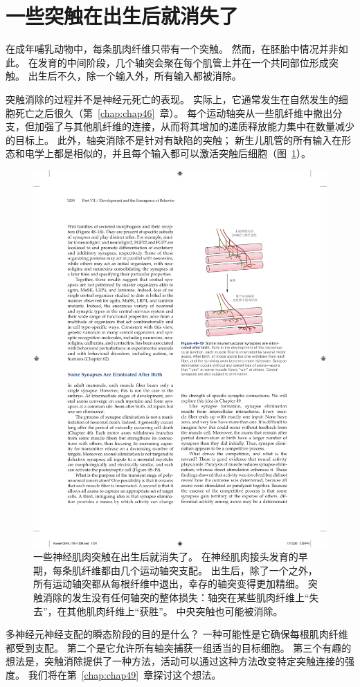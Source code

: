 \section{一些突触在出生后就消失了}

在成年哺乳动物中，每条肌肉纤维只带有一个突触。
然而，在胚胎中情况并非如此。
在发育的中间阶段，几个轴突会聚在每个肌管上并在一个共同部位形成突触。
出生后不久，除一个输入外，所有输入都被消除。


突触消除的过程并不是神经元死亡的表现。 实际上，它通常发生在自然发生的细胞死亡之后很久（第~\ref{chap:chap46}~章）。
每个运动轴突从一些肌纤维中撤出分支，但加强了与其他肌纤维的连接，从而将其增加的递质释放能力集中在数量减少的目标上。
此外，轴突消除不是针对有缺陷的突触；
新生儿肌管的所有输入在形态和电学上都是相似的，并且每个输入都可以激活突触后细胞（图~\ref{fig:48_19}）。


\begin{figure}[htbp]
	\centering
	\includegraphics[width=0.63\linewidth]{chap48/fig_48_19}
	\caption{一些神经肌肉突触在出生后就消失了。
		在神经肌肉接头发育的早期，每条肌纤维都由几个运动轴突支配。
		出生后，除了一个之外，所有运动轴突都从每根纤维中退出，幸存的轴突变得更加精细。
		突触消除的发生没有任何轴突的整体损失：轴突在某些肌肉纤维上“失去”，在其他肌肉纤维上“获胜”。
		中央突触也可能被消除。}
	\label{fig:48_19}
\end{figure}


多神经元神经支配的瞬态阶段的目的是什么？
一种可能性是它确保每根肌肉纤维都受到支配。
第二个是它允许所有轴突捕获一组适当的目标细胞。
第三个有趣的想法是，突触消除提供了一种方法，活动可以通过这种方法改变特定突触连接的强度。
我们将在第~\ref{chap:chap49}~章探讨这个想法。


